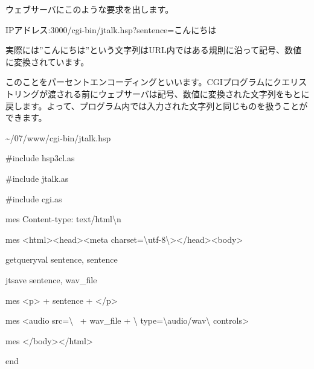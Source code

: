 \documentclass[a4paper,12pt,dvipdfmx]{jarticle}
\begin{document}
\bigskip

%


ウェブサーバにこのような要求を出します。

IPアドレス:3000/cgi-bin/jtalk.hsp?sentence=こんにちは

実際には”こんにちは”という文字列はURL内ではある規則に沿って記号、数値に変換されています。

このことをパーセントエンコーディングといいます。CGIプログラムにクエリストリングが渡される前にウェブサーバは記号、数値に変換された文字列をもとに戻します。よって、プログラム内では入力された文字列と同じものを扱うことができます。

\~{}/07/www/cgi-bin/jtalk.hsp

\centering
\begin{boxedminipage}{\textwidth}
	\#include {\textquotedbl}hsp3cl.as{\textquotedbl}

	\#include {\textquotedbl}jtalk.as{\textquotedbl}

	\#include {\textquotedbl}cgi.as{\textquotedbl}


	\bigskip

	mes {\textquotedbl}Content-type: text/html{\textbackslash}n{\textquotedbl}

	mes {\textquotedbl}{\textless}html{\textgreater}{\textless}head{\textgreater}{\textless}meta
	charset={\textbackslash}{\textquotedbl}utf-8{\textbackslash}{\textquotedbl}{\textgreater}{\textless}/head{\textgreater}{\textless}body{\textgreater}{\textquotedbl}


	\bigskip

	getqueryval {\textquotedbl}sentence{\textquotedbl}, sentence

	jtsave sentence, wav\_file

	mes {\textquotedbl}{\textless}p{\textgreater}{\textquotedbl} + sentence +
	{\textquotedbl}{\textless}/p{\textgreater}{\textquotedbl}


	\bigskip

	mes {\textquotedbl}{\textless}audio src={\textbackslash}{\textquotedbl}{\textquotedbl} \ + wav\_file +
	{\textquotedbl}{\textbackslash}{\textquotedbl}
	type={\textbackslash}{\textquotedbl}audio/wav{\textbackslash}{\textquotedbl} controls{\textgreater}{\textquotedbl}

	mes {\textquotedbl}{\textless}/body{\textgreater}{\textless}/html{\textgreater}{\textquotedbl}

	end
\end{boxedminipage}
\flushleft
\end{document}
